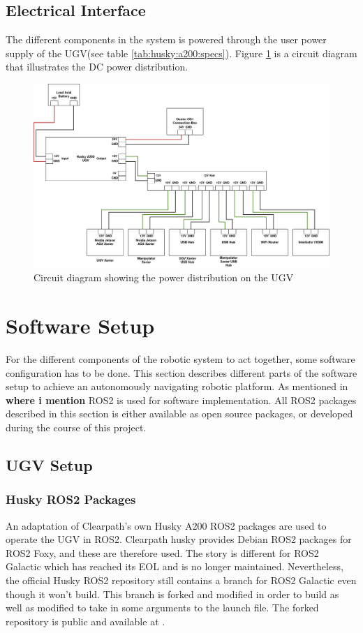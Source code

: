 \subsection{Electrical Interface}
The different components in the system is powered through the user power supply of the UGV(see table \ref{tab:husky:a200:specs}). Figure \ref{fig:circuit_diagram} is a circuit diagram that illustrates the DC power distribution.

\begin{figure}[H]
  \centering
  \includegraphics[width = 1\textwidth]{Figures/circuit_diagram.drawio.png}
  \caption{Circuit diagram showing the power distribution on the UGV}
  \label{fig:circuit_diagram}
\end{figure}

\section{Software Setup}
For the different components of the robotic system to act together, some software configuration has to be done. This section describes different  parts of the software setup to achieve an autonomously navigating robotic platform. As mentioned in \textbf{where i mention} ROS2 is used for software implementation. All ROS2 packages described in this section is either available as open source packages, or developed during the course of this project.

\subsection{UGV Setup}
\subsubsection{Husky ROS2 Packages}
An adaptation of Clearpath's own Husky A200 ROS2 packages are used to operate the UGV in ROS2. Clearpath husky provides Debian ROS2 packages for ROS2 Foxy, and these are therefore used. The story is different for ROS2 Galactic which has reached its EOL and is no longer maintained. Nevertheless, the official Husky ROS2 repository\cite{husky_repo} still contains a branch for ROS2 Galactic even though it won't build. This branch is forked and modified in order to build as well as modified to take in some arguments to the launch file. The forked repository is public and available at \cite{uia_husky_repo}.

